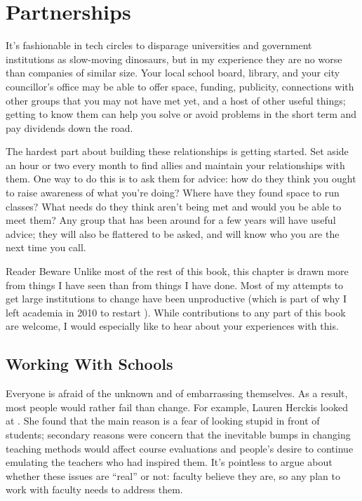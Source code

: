 \chapter{Partnerships}\label{s:partner}

It's fashionable in tech circles
to disparage universities and government institutions as slow-moving dinosaurs,
but in my experience they are no worse than companies of similar size.
Your local school board, library, and your city councillor's office
may be able to offer space, funding, publicity,
connections with other groups that you may not have met yet,
and a host of other useful things;
getting to know them can help you solve or avoid problems in the short term
and pay dividends down the road.

The hardest part about building these relationships is getting started.
Set aside an hour or two every month
to find allies and maintain your relationships with them.
One way to do this is to ask them for advice:
how do they think you ought to raise awareness of what you're doing?
Where have they found space to run classes?
What needs do they think aren't being met
and would you be able to meet them?
Any group that has been around for a few years will have useful advice;
they will also be flattered to be asked,
and will know who you are the next time you call.

\begin{aside}{Reader Beware}
  Unlike most of the rest of this book,
  this chapter is drawn more from things I have seen than from things I have done.
  Most of my attempts to get large institutions to change have been unproductive
  (which is part of why I left academia in 2010
  to restart ).
  While contributions to any part of this book are welcome,
  I would especially like to hear about your experiences with this.
\end{aside}

\section{Working With Schools}\label{s:partner-schools}

Everyone is afraid of the unknown and of embarrassing themselves.
As a result,
most people would rather fail than change.
For example, Lauren Herckis looked at
.
She found that the main reason is a fear of looking stupid in front of students;
secondary reasons were
concern that the inevitable bumps in changing teaching methods would affect course evaluations
and people's desire to continue emulating the teachers who had inspired them.
It's pointless to argue about whether these issues are ``real'' or not:
faculty believe they are,
so any plan to work with faculty needs to address them.

